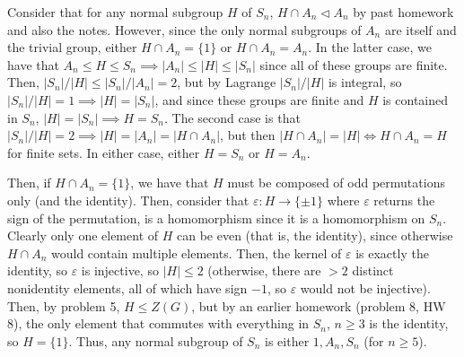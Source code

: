 \documentclass[12pt,letterpaper]{article}
\theoremstyle{definition}
\begin{document}
Consider that for any normal subgroup $H$ of $S_{n}$, $H \cap A_{n} \lhd A_{n}$ by past homework and also the notes. However, since the only normal subgroups of $A_{n}$ are itself and the trivial group, either $H \cap A_{n} = \{1\}$ or $H \cap A_{n} = A_{n}$. In the latter case, we have that $A_{n} \leq H \leq S_{n} \implies |A_{n}| \leq |H| \leq |S_{n}|$ since all of these groups are finite. Then, $|S_{n}|/|H| \leq |S_{n}|/|A_{n}| = 2$, but by Lagrange $|S_{n}|/|H|$ is integral, so $|S_{n}|/|H| = 1 \implies |H| = |S_{n}|$, and since these groups are finite and $H$ is contained in $S_{n}$, $|H| = |S_{n}| \implies H = S_{n}$. The second case is that $|S_{n}|/|H| = 2 \implies |H| = |A_{n}| = |H \cap A_{n}|$, but then $|H \cap A_{n}| = |H| \iff H \cap A_{n} = H$ for finite sets. In either case, either $H = S_{n}$ or $H = A_{n}$.

Then, if $H \cap A_{n} = \{1\}$, we have that $H$ must be composed of odd permutations only (and the identity). Then, consider that $\varepsilon: H \rightarrow \{\pm 1\}$ where $\varepsilon$ returns the sign of the permutation, is a homomorphism since it is a homomorphism on $S_{n}$. Clearly only one element of $H$ can be even (that is, the identity), since otherwise $H \cap A_{n}$ would contain multiple elements. Then, the kernel of $\varepsilon$ is exactly the identity, so $\varepsilon$ is injective, so $|H| \leq 2$ (otherwise, there are $> 2$ distinct nonidentity elements, all of which have sign $-1$, so $\varepsilon$ would not be injective). Then, by problem 5, $H \leq Z(G)$, but by an earlier homework (problem 8, HW 8), the only element that commutes with everything in $S_{n}$, $n \geq 3$ is the identity, so $H = \{1\}$. Thus, any normal subgroup of $S_{n}$ is either $1, A_{n}, S_{n}$ (for $n \geq 5$).
\end{document}
